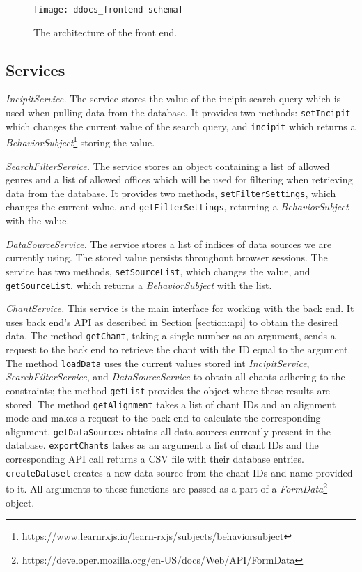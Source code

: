 \begin{figure}[!h]
\centering
\texttt{[image: ddocs\_frontend-schema]}
\caption{The architecture of the front end.}
\label{fig:frontend-schema}
\end{figure}

\subsection{Services}

\emph{IncipitService.} The service stores the value of the incipit search query which is used when pulling data from the database. It provides two methods:
\verb|setIncipit| which changes the current value of the search query, and \verb|incipit| which returns a \emph{BehaviorSubject}\footnote{https://www.learnrxjs.io/learn-rxjs/subjects/behaviorsubject}
storing the value.

\emph{SearchFilterService.} The service stores an object containing a list of allowed genres and a list of allowed offices which will be used for filtering
when retrieving data from the database. It provides two methods, \verb|setFilterSettings|, which changes the current value, and \verb|getFilterSettings|, returning
a \emph{BehaviorSubject} with the value.

\emph{DataSourceService.} The service stores a list of indices of data sources we are currently using. The stored value persists throughout browser sessions.
The service has two methods, \verb|setSourceList|, which changes the value, and \verb|getSourceList|, which returns a \emph{BehaviorSubject} with the list.

\emph{ChantService.} This service is the main interface for working with the back end. It uses back end's API as described in Section \ref{section:api} to
obtain the desired data. The method \verb|getChant|, taking a single number as an argument, sends a request to the back end to retrieve the chant with 
the ID equal to the argument. The method \verb|loadData| uses the current values stored int \emph{IncipitService}, \emph{SearchFilterService}, and
\emph{DataSourceService} to obtain all chants adhering to the constraints; the method \verb|getList| provides the object where these results are stored.
The method \verb|getAlignment| takes a list of chant IDs and an alignment mode and makes a request to the back end to calculate the corresponding alignment.
\verb|getDataSources| obtains all data sources currently present in the database. \verb|exportChants| takes as an argument a list of chant IDs and the 
corresponding API call returns a CSV file with their database entries. \verb|createDataset| creates a new data source from the chant IDs and name provided
to it. All arguments to these functions are passed as a part of a \emph{FormData}\footnote{https://developer.mozilla.org/en-US/docs/Web/API/FormData}
object.

